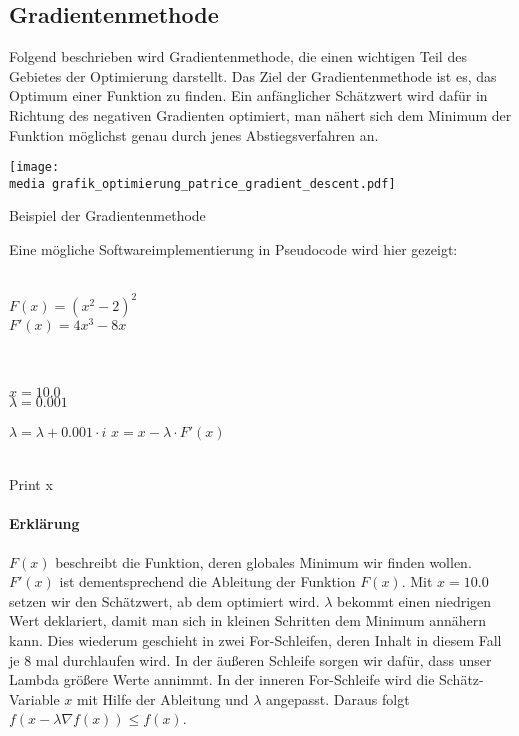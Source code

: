 \subsection{Gradientenmethode}

Folgend beschrieben wird Gradientenmethode, die einen wichtigen Teil des Gebietes der Optimierung darstellt.
Das Ziel der Gradientenmethode ist es, das Optimum einer Funktion zu finden. Ein 
anfänglicher Schätzwert wird dafür in Richtung des negativen Gradienten 
optimiert, man nähert sich dem Minimum der Funktion möglichst genau durch jenes 
Abstiegsverfahren an.

\begin{dsafigure}
\begin{center}
\texttt{[image: \\media grafik\_optimierung\_patrice\_gradient\_descent.pdf]}
\label{figure:grafik_optimierung_patrice_gradient_descent}
\caption{Beispiel der Gradientenmethode}
\end{center}
\end{dsafigure}

Eine mögliche Softwareimplementierung in Pseudocode wird hier gezeigt:

\begin{algorithmic}[1]

   \\$F(x) = (x^2-2)^2$
\\$F'(x) = 4x^3-8x$

\\
\\$x = 10.0$
\\$\lambda = 0.001$

 \State $\lambda = \lambda+0.001\cdot i$
    \State $x = x - \lambda \cdot F'(x)$
  \EndFor
\EndFor
 
 
\\Print x\EndProcedure
\Statex
\end{algorithmic}

\paragraph{Erklärung}

$F(x)$ beschreibt die Funktion, deren globales Minimum wir finden wollen. $F'(x)$ ist dementsprechend die Ableitung der Funktion $F(x)$. Mit $x=10.0$ setzen wir den Schätzwert, ab dem optimiert wird. $\lambda$ bekommt einen niedrigen Wert deklariert, damit man sich in kleinen Schritten dem Minimum annähern kann. Dies wiederum geschieht in zwei For-Schleifen, deren Inhalt in diesem Fall je 8 mal durchlaufen wird. In der äußeren Schleife sorgen wir dafür, dass unser Lambda größere Werte annimmt. In der inneren For-Schleife wird die Schätz-Variable $x$ mit Hilfe der Ableitung und $\lambda$ angepasst. Daraus folgt
 $f(x-\lambda \nabla f(x)) \leq f(x)$.

